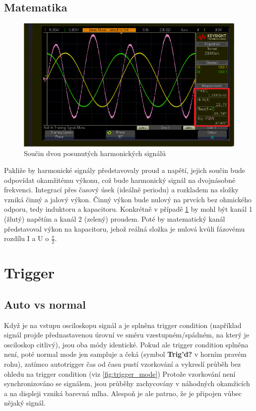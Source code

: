 \documentclass[twoside]{article}
\begin{document}
\subsection{Matematika}
\begin{figure}[htbp]
	\centering
	\includegraphics[width=.8\linewidth]{sinus_matematika_stredni_hodnota.png  }
	\caption{Součin dvou posunutých harmonických signálů}
	\label{fig:vykon}
\end{figure}
Pakliže by harmonické signály představovaly proud a napětí, jejich součin bude odpovídat okamžitému výkonu,
což bude harmonický signál na dvojnásobné frekvenci.
Integrací přes časový úsek (ideálně periodu) a rozkladem na složky vzniká činný a jalový výkon.
Činný výkon bude nulový na prvcích bez ohmického odporu, tedy induktoru a kapacitoru. Konkrétně v případě \ref{fig:vykon}
by mohl být kanál 1 (žlutý) napětím a kanál 2 (zelený) proudem. Poté by matematický kanál představoval výkon na kapacitoru,
jehož reálná složka je nulová kvůli fázovému rozdílu I a U o $\frac{\pi}{2}$. 


\section{Trigger}

\subsection{Auto vs normal}

Když je na vstupu osciloskopu signál a je splněna trigger condition (například signál projde přednastavenou úrovní ve směru
vzestupném/spádném, na který je osciloskop citlivý), jsou oba módy identické. Pokud ale trigger condition splněna není, poté normal mode jen sampluje a čeká
(symbol \textbf{Trig'd?} v horním pravém rohu), zatímco autotrigger čas od času pustí vzorkování a vykreslí
průběh bez ohledu na trigger condition (viz \ref{fig:trigger_mode}) Protože vzorkování není synchronizováno se signálem, jsou průběhy zachycovány v náhodných okamžicích a na displeji vzniká
barevná mlha. Alespoň je ale patrno, že je připojen vůbec nějaký signál.
\end{document}
